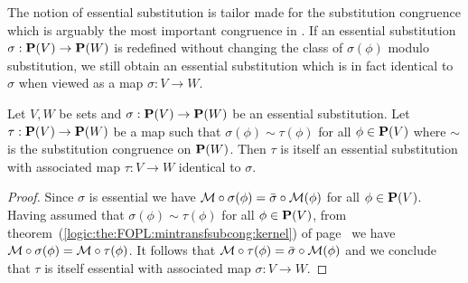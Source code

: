 The notion of essential substitution is tailor made for the
substitution congruence which is arguably the most important
congruence in \pv. If an essential substitution $\sigma:\mbox{${\bf P}(V)$}\to{\bf
P}(W)$ is redefined without changing the class of $\sigma(\phi)$
modulo substitution, we still obtain an essential substitution which
is in fact identical to $\sigma$ when viewed as a map $\sigma:V\to
W$.
\begin{prop}\label{logic:prop:FOPL:esssubstprop:redefine}
Let $V,W$ be sets and $\sigma:\mbox{${\bf P}(V)$}\to{\bf P}(W)$ be an essential
substitution. Let $\tau:\mbox{${\bf P}(V)$}\to{\bf P}(W)$ be a map such that
$\sigma(\phi)\sim\tau(\phi)$ for all $\phi\in\mbox{${\bf P}(V)$}$ where $\sim$ is
the substitution congruence on ${\bf P}(W)$. Then $\tau$ is itself
an essential substitution with associated map $\tau:V\to W$
identical to $\sigma$.
\end{prop}
\begin{proof}
Since $\sigma$ is essential we have ${\cal
M}\circ\sigma(\phi)=\bar{\sigma}\circ{\cal M}(\phi)$ for all
$\phi\in\mbox{${\bf P}(V)$}$. Having assumed that $\sigma(\phi)\sim\tau(\phi)$ for
all $\phi\in\mbox{${\bf P}(V)$}$, from
theorem~(\ref{logic:the:FOPL:mintransfsubcong:kernel}) of
page~\pageref{logic:the:FOPL:mintransfsubcong:kernel} we have ${\cal
M}\circ\sigma(\phi)={\cal M}\circ\tau(\phi)$. It follows that ${\cal
M}\circ\tau(\phi)=\bar{\sigma}\circ{\cal M}(\phi)$ and we conclude
that $\tau$ is itself essential with associated map $\sigma:V\to W$.
\end{proof}

